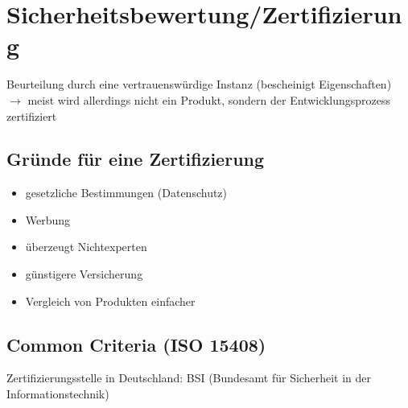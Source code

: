 \documentclass[a4paper,twoside,DIV15,BCOR12mm]{scrbook}
\begin{document}

\chapter{Sicherheitsbewertung/Zertifizierung}

Beurteilung durch eine vertrauenswürdige Instanz (bescheinigt Eigenschaften) $\rightarrow$ meist wird allerdings nicht ein Produkt, sondern der Entwicklungsprozess zertifiziert

\section{Gründe für eine Zertifizierung}

\begin{itemize}
	\item gesetzliche Bestimmungen (Datenschutz)
	\item Werbung
	\item überzeugt Nichtexperten
	\item günstigere Versicherung
	\item Vergleich von Produkten \glqq einfacher\grqq
\end{itemize}

\section{Common Criteria (ISO 15408)}

Zertifizierungsstelle in Deutschland: BSI (Bundesamt für Sicherheit in der Informationstechnik)
\end{document}
